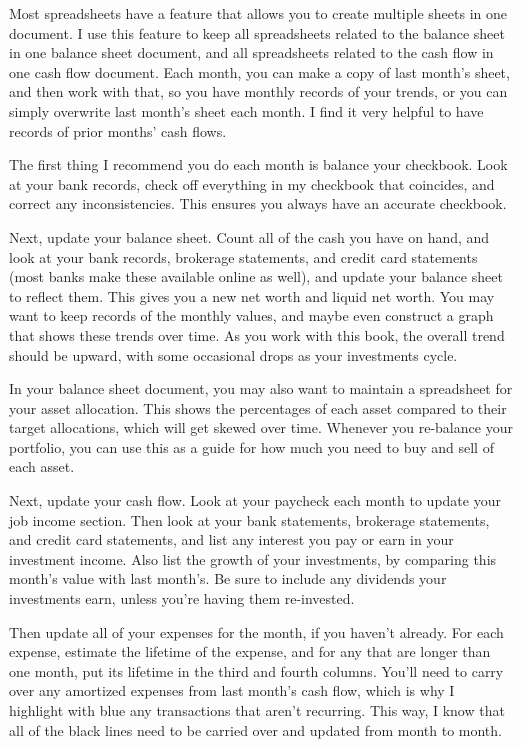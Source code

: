 Most spreadsheets have a feature that allows you to create multiple sheets in one document. I use this feature to keep all spreadsheets related to the balance sheet in one balance sheet document, and all spreadsheets related to the cash flow in one cash flow document. Each month, you can make a copy of last month's sheet, and then work with that, so you have monthly records of your trends, or you can simply overwrite last month's sheet each month. I find it very helpful to have records of prior months' cash flows.

The first thing I recommend you do each month is balance your checkbook. Look at your bank records, check off everything in my checkbook that coincides, and correct any inconsistencies. This ensures you always have an accurate checkbook.

Next, update your balance sheet. Count all of the cash you have on hand, and look at your bank records, brokerage statements, and credit card statements (most banks make these available online as well), and update your balance sheet to reflect them. This gives you a new net worth and liquid net worth. You may want to keep records of the monthly values, and maybe even construct a graph that shows these trends over time. As you work with this book, the overall trend should be upward, with some occasional drops as your investments cycle.

In your balance sheet document, you may also want to maintain a spreadsheet for your asset allocation. This shows the percentages of each asset compared to their target allocations, which will get skewed over time. Whenever you re-balance your portfolio, you can use this as a guide for how much you need to buy and sell of each asset.

Next, update your cash flow. Look at your paycheck each month to update your job income section. Then look at your bank statements, brokerage statements, and credit card statements, and list any interest you pay or earn in your investment income. Also list the growth of your investments, by comparing this month's value with last month's. Be sure to include any dividends your investments earn, unless you're having them re-invested.

Then update all of your expenses for the month, if you haven't already. For each expense, estimate the lifetime of the expense, and for any that are longer than one month, put its lifetime in the third and fourth columns. You'll need to carry over any amortized expenses from last month's cash flow, which is why I highlight with blue any transactions that aren't recurring. This way, I know that all of the black lines need to be carried over and updated from month to month.

